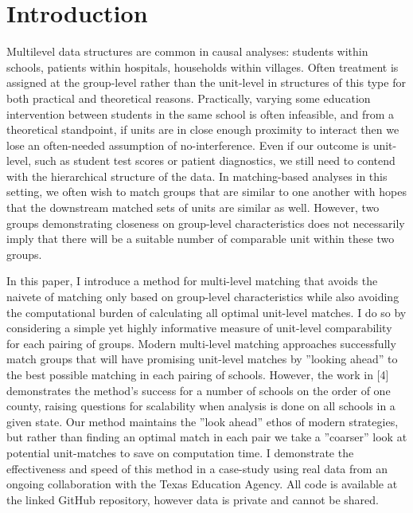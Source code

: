 \documentclass[aoas]{imsart}
\theoremstyle{plain}
\theoremstyle{definition}
\begin{document}
\section{Introduction}

Multilevel data structures are common in causal analyses: students within schools, patients within hospitals,
households within villages. Often treatment is assigned at the group-level rather than the unit-level in structures of this type for both practical and theoretical reasons. Practically, varying some education intervention
between students in the same school is often infeasible, and from a theoretical standpoint, if units are in
close enough proximity to interact then we lose an often-needed assumption of no-interference. Even if our
outcome is unit-level, such as student test scores or patient diagnostics, we still need to contend with the
hierarchical structure of the data. In matching-based analyses in this setting, we often wish to match groups
that are similar to one another with hopes that the downstream matched sets of units are similar as well.
However, two groups demonstrating closeness on group-level characteristics does not necessarily imply that
there will be a suitable number of comparable unit within these two groups. 

In this paper, I introduce a method for multi-level matching that avoids the naivete of matching only
based on group-level characteristics while also avoiding the computational burden of calculating all optimal
unit-level matches. I do so by considering a simple yet highly informative measure of unit-level comparability
for each pairing of groups. Modern multi-level matching approaches successfully match groups that will have
promising unit-level matches by ”looking ahead” to the best possible matching in each pairing of schools.
However, the work in [4] demonstrates the method's success for a number of schools on the order of one county, raising questions for scalability when analysis is done on all schools in a given state.
Our method
maintains the ”look ahead” ethos of modern strategies, but rather than finding an optimal match in each
pair we take a ”coarser” look at potential unit-matches to save on computation time. I demonstrate the
effectiveness and speed of this method in a case-study using real data from an ongoing collaboration with
the Texas Education Agency. All code is available at the linked GitHub repository, however data is private
and cannot be shared.
\end{document}
